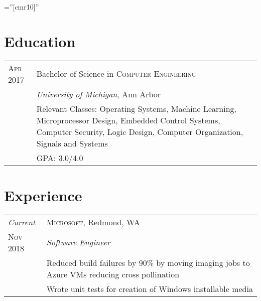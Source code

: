 \documentclass[a4paper,12pt]{article} %
\begin{document}
\pagestyle{empty} %

\font\fb=''[cmr10]'' %


\par{\par} %
\par{\par}


\section{Education}

\begin{tabular}{R{2.1cm}|p{15.5cm}}
\hspace{4pt}\textsc{Apr} 2017 & Bachelor of Science in
 \textsc{Computer Engineering} \\
& \normalsize\emph{University of Michigan}, Ann Arbor \\
& \footnotesize{Relevant Classes: Operating Systems, Machine Learning,
  Microprocessor Design, Embedded Control Systems, Computer Security,
  Logic Design, Computer Organization, Signals and Systems}\\
& \footnotesize{GPA: 3.0/4.0} \\
\end{tabular}


\section{Experience}

\begin{tabular}{R{2.1cm}|p{15.5cm}}
\emph{Current} & \textsc{Microsoft}, Redmond, WA \\
\textsc{Nov 2018} & \emph{Software Engineer} \\
& \footnotesize{Reduced build failures by 90\% by moving imaging jobs to Azure
  VMs reducing cross pollination} \\
& \footnotesize{Wrote unit tests for creation of Windows installable media} \\
\end{tabular}
\end{document}
